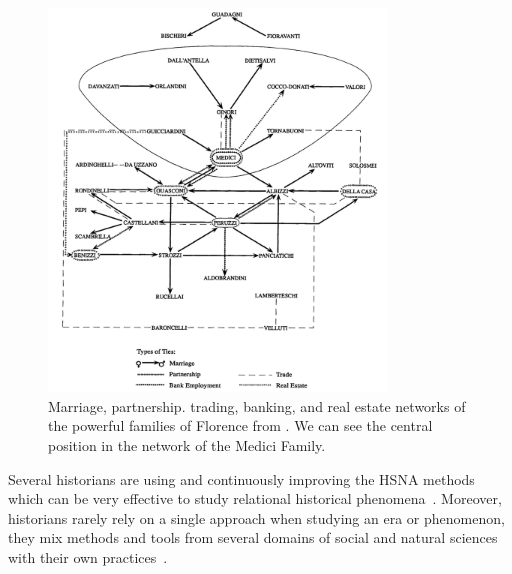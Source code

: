 \begin{figure}[!ht]
    \centering %
    \includegraphics[width=0.8\textwidth]{static/figures/RelatedWork/padgett-Medicis.png}
    \caption{Marriage, partnership. trading, banking, and real estate networks of the powerful families of Florence from \cite{padgettRobustActionRise1993}. We can see the central position in the network of the Medici Family.}
    \label{fig:padgett-medicis}
\end{figure}

Several historians are using and continuously improving the HSNA methods which can be very effective to study relational historical phenomena~\cite{kerschbaumerPowerNetworksProspects2015}.
Moreover, historians rarely rely on a single approach when studying an era or phenomenon, they mix methods and tools from several domains of social and natural sciences with their own practices~\cite{padgettRobustActionRise1993, petzCombiningNetworkResearch2022}.






